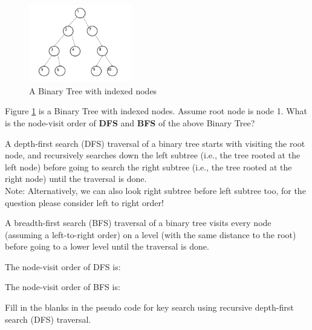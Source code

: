 \documentclass[11pt,addpoints,answers]{exam}
\numberwithin{equation}{section} %
\numberwithin{figure}{section} %
\numberwithin{table}{section} %
\begin{document}
\begin{questions}
    
    \begin{figure}[H]
        \centering
        \includegraphics[width = 0.4\textwidth]{TreePlot.png}
        \caption{A Binary Tree with indexed nodes}
        \label{tree}
    \end{figure}
    \question[2] Figure \ref{tree} is a Binary Tree with indexed nodes. Assume root node is node 1. What is the node-visit order of \textbf{DFS} and \textbf{BFS} of the above Binary Tree? 
    
    A depth-first search (DFS) traversal of a binary tree starts with visiting the root node, and recursively searches down the left subtree (i.e., the tree rooted at the left node) before going to search the right subtree (i.e., the tree rooted at the right node) until the traversal is done.\\
    Note: Alternatively, we can also look right subtree before left subtree too, for the question please consider left to right order!
    
    A breadth-first search (BFS) traversal of a binary tree visits every node (assuming a left-to-right order) on a level (with the same distance to the root) before going to a lower level until the traversal is done.
    
    The node-visit order of DFS is:
    
    \begin{tcolorbox}[fit,height=1cm, width=\textwidth, blank, borderline={1pt}{-2pt},nobeforeafter]
    \end{tcolorbox}
    
    The node-visit order of BFS is:
    
    \begin{tcolorbox}[fit,height=1cm, width=\textwidth, blank, borderline={1pt}{-2pt},nobeforeafter]
    \end{tcolorbox}
    
    
    \clearpage
    
    \question[2] Fill in the blanks in the pseudo code for key search using recursive depth-first search (DFS) traversal.
    

\end{questions}
\end{document}
